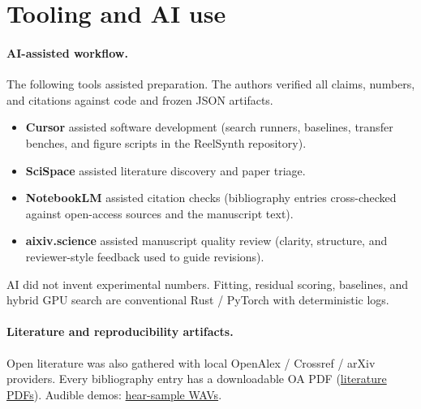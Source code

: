 \section{Tooling and AI use}
\label{sec:tooling}

\paragraph{AI-assisted workflow.}
The following tools assisted preparation. The authors verified all claims, numbers, and citations against code and frozen JSON artifacts.
\begin{itemize}
  \item \textbf{Cursor} assisted software development (search runners, baselines, transfer benches, and figure scripts in the ReelSynth repository).
  \item \textbf{SciSpace} assisted literature discovery and paper triage.
  \item \textbf{NotebookLM} assisted citation checks (bibliography entries cross-checked against open-access sources and the manuscript text).
  \item \textbf{aixiv.science} assisted manuscript quality review (clarity, structure, and reviewer-style feedback used to guide revisions).
\end{itemize}
AI did not invent experimental numbers.
Fitting, residual scoring, baselines, and hybrid GPU search are conventional Rust / PyTorch with deterministic logs.

\paragraph{Literature and reproducibility artifacts.}
Open literature was also gathered with local OpenAlex / Crossref / arXiv providers. Every bibliography entry has a downloadable OA PDF
(\href{https://github.com/reeldemo/denoise-opt-meta/tree/master/artifacts/literature_oa/pdfs}{literature PDFs}).
Audible demos:
\href{https://github.com/reeldemo/reelsynth/tree/main/brand/artifacts/meta_approach_compare/hear_samples}{hear-sample WAVs}.
